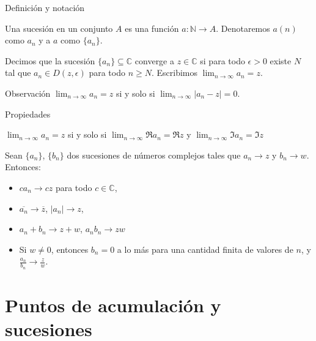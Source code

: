 \documentclass[spanish,presentation]{beamer}
\begin{document}
\begin{frame}[label=sec-2-1]{Definición y notación}
\begin{definition}[Sucesión]
Una \alert{sucesión} en un conjunto \(A\) es una función
\(a\colon\mathbb{N}\to A\). Denotaremos \(a(n)\) como \(a_{n}\) y
a \(a\) como \(\{a_{n}\}\).
\end{definition}

\begin{definition}[Convergencia]
Decimos que la sucesión \(\{a_{n}\}\subseteq \mathbb{C}\) \alert{converge}
a \(z\in\mathbb{C}\) si para todo \(\epsilon>0\) existe \(N\) tal
que \(a_{n}\in D(z,\epsilon)\) para todo \(n\geq N\). Escribimos
\(\lim_{n\to\infty}a_{n}=z\). 
\end{definition}

\begin{block}{Observación}
\(\lim_{n\to\infty}a_{n}=z\) si y solo si \(\lim_{n\to\infty}|a_{n}-z|=0\).
\end{block}
\end{frame}

\begin{frame}[label=sec-2-2]{Propiedades}
\begin{theorem}
\(\lim_{n\to\infty}a_{n}=z\) si y solo si \(\lim_{n\to\infty}\Re
    a_{n}=\Re z\) y \(\lim_{n\to\infty}\Im a_{n}=\Im z\)
\end{theorem}

\begin{theorem}
Sean \(\{a_{n}\}\), \(\{b_{n}\}\) dos sucesiones de números
complejos tales que \(a_{n}\to z\) y \(b_{n}\to w\). Entonces:

\begin{itemize}
\item \(ca_{n}\to cz\) para todo \(c\in \mathbb{C}\),
\item \(\overline{a_{n}}\to \overline{z}\), \(|a_{n}|\to z\),
\item \(a_{n}+b_{n}\to z+w\), \(a_{n}b_{n}\to zw\)
\item Si \(w\ne 0\), entonces \(b_{n}= 0\) a lo más para una cantidad
finita de valores de \(n\), y \(\frac{a_{n}}{b_{n}}\to
      \frac{z}{w}\).
\end{itemize}
\end{theorem}
\end{frame}

\section{Puntos de acumulación y sucesiones}
\label{sec-3}
\end{document}
